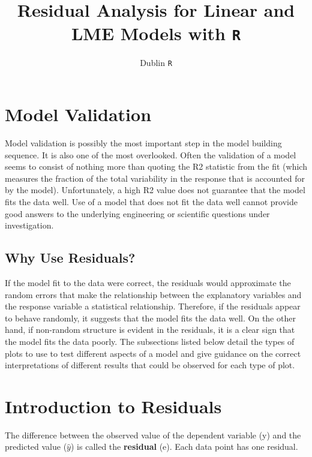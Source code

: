 \documentclass[12pt]{article}
\title{Residual Analysis for Linear and LME Models with \texttt{R}}
\author{Dublin \texttt{R}}
\begin{document}
\maketitle

\begin{abstract}

\end{abstract}
\section{Model Validation}
Model validation is possibly the most important step in the model building sequence. It is also one of the most overlooked. Often the validation of a model seems to consist of nothing more than quoting the R2 statistic from the fit (which measures the fraction of the total variability in the response that is accounted for by the model). Unfortunately, a high R2 value does not guarantee that the model fits the data well. Use of a model that does not fit the data well cannot provide good answers to the underlying engineering or scientific questions under investigation.

\subsection{Why Use Residuals?}

If the model fit to the data were correct, the residuals would approximate the random errors that make the relationship between the explanatory variables and the response variable a statistical relationship. Therefore, if the residuals appear to behave randomly, it suggests that the model fits the data well. On the other hand, if non-random structure is evident in the residuals, it is a clear sign that the model fits the data poorly. The subsections listed below detail the types of plots to use to test different aspects of a model and give guidance on the correct interpretations of different results that could be observed for each type of plot.
\section{Introduction to Residuals}

The difference between the observed value of the dependent variable (y) and the predicted value ($\hat{y}$) is called the \textbf{residual} (e). Each data point has one residual.
\end{document}
